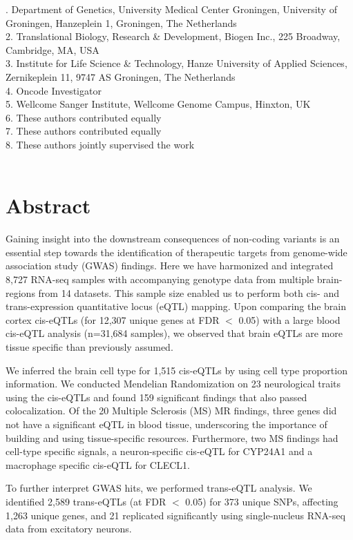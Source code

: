 . Department of Genetics, University Medical Center Groningen, University of Groningen, Hanzeplein 1, Groningen, The Netherlands \\
2. Translational Biology, Research \& Development, Biogen Inc., 225 Broadway, Cambridge, MA, USA \\
3. Institute for Life Science \& Technology, Hanze University of Applied Sciences, Zernikeplein 11, 9747 AS Groningen, The Netherlands \\
4. Oncode Investigator \\
5. Wellcome Sanger Institute, Wellcome Genome Campus, Hinxton, UK \\
6. These authors contributed equally \\
7. These authors contributed equally \\
8. These authors jointly supervised the work 
\\
\\

\newpage

\section*{Abstract}
Gaining insight into the downstream consequences of non-coding variants is an essential step towards the identification of therapeutic targets from genome-wide association study (GWAS) findings.  Here we have harmonized and integrated 8,727 RNA-seq samples with accompanying genotype data from multiple brain-regions from 14 datasets. This sample size enabled us to perform both cis- and trans-expression quantitative locus (eQTL) mapping. Upon comparing the brain cortex cis-eQTLs (for 12,307 unique genes at FDR $<$ 0.05) with a large blood cis-eQTL analysis (n=31,684 samples), we observed that brain eQTLs are more tissue specific than previously assumed. 

We inferred the brain cell type for 1,515 cis-eQTLs by using cell type proportion information. We conducted Mendelian Randomization on 23 neurological traits using the cis-eQTLs and found 159 significant findings that also passed colocalization. Of the 20 Multiple Sclerosis (MS) MR findings, three genes did not have a significant eQTL in blood tissue, underscoring the importance of building and using tissue-specific resources. Furthermore, two MS findings had cell-type specific signals, a neuron-specific cis-eQTL for CYP24A1 and a macrophage specific cis-eQTL for CLECL1.  

To further interpret GWAS hits, we performed trans-eQTL analysis. We identified 2,589 trans-eQTLs (at FDR $<$ 0.05) for 373 unique SNPs, affecting 1,263 unique genes, and 21 replicated significantly using single-nucleus RNA-seq data from excitatory neurons.  

